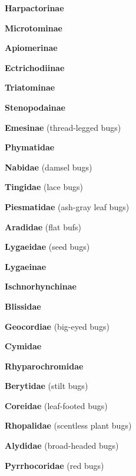 \documentclass[letterpaper,10pt]{article}
\begin{document}
{\makebox[0.80cm]{}  \textbf{Harpactorinae} \par
\makebox[0.80cm]{}  \textbf{Microtominae} \par
\makebox[0.80cm]{}  \textbf{Apiomerinae} \par
\makebox[0.80cm]{}  \textbf{Ectrichodiinae} \par
\makebox[0.80cm]{}  \textbf{Triatominae} \par
\makebox[0.80cm]{}  \textbf{Stenopodainae} \par
\makebox[0.80cm]{}  \textbf{Emesinae} (thread-legged bugs) \par
\makebox[0.80cm]{}  \textbf{Phymatidae} \par
\makebox[0.6cm]{}  \textbf{Nabidae} (damsel bugs) \par
\makebox[0.6cm]{}  \textbf{Tingidae} (lace bugs) \par
\makebox[0.6cm]{}  \textbf{Piesmatidae} (ash-gray leaf bugs) \par
\makebox[0.6cm]{}  \textbf{Aradidae} (flat bufs) \par
\makebox[0.6cm]{}  \textbf{Lygaeidae} (seed bugs) \par
\makebox[0.80cm]{}  \textbf{Lygaeinae} \par
\makebox[0.80cm]{}  \textbf{Ischnorhynchinae} \par
\makebox[0.6cm]{}  \textbf{Blissidae} \par
\makebox[0.6cm]{}  \textbf{Geocordiae} (big-eyed bugs) \par
\makebox[0.6cm]{}  \textbf{Cymidae} \par
\makebox[0.6cm]{}  \textbf{Rhyparochromidae} \par
\makebox[0.6cm]{}  \textbf{Berytidae} (stilt bugs) \par
\makebox[0.6cm]{}  \textbf{Coreidae} (leaf-footed bugs) \par
\makebox[0.6cm]{}  \textbf{Rhopalidae} (scentless plant bugs) \par
\makebox[0.6cm]{}  \textbf{Alydidae} (broad-headed bugs) \par
\makebox[0.6cm]{}  \textbf{Pyrrhocoridae} (red bugs) \par
}
\end{document}
